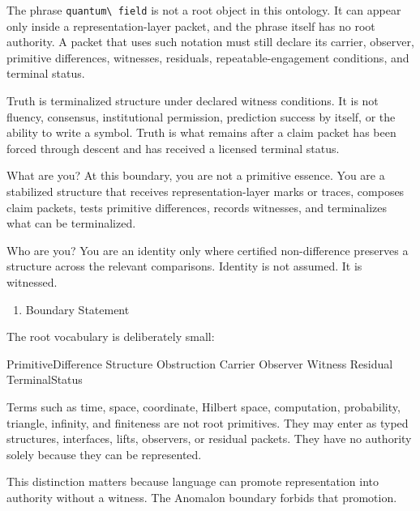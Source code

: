 \documentclass[
  10pt,
]{article}
\newenvironment{Shaded}{}{}
\newcommand{\NormalTok}[1]{#1}
\providecommand{\tightlist}{%
  \setlength{\itemsep}{0pt}\setlength{\parskip}{0pt}}
\providecommand{\tightlist}{%
  \setlength{\itemsep}{0pt}\setlength{\parskip}{0pt}}
\DeclareRobustCommand{\texttt}[1]{{\paperSymbolFont\nolinkurl{#1}}}
\begin{document}
The phrase \texttt{quantum\ field} is not a root object in this ontology. It can appear only inside a representation-layer packet, and the phrase itself has no root authority. A packet that uses such notation must still declare its carrier, observer, primitive differences, witnesses, residuals, repeatable-engagement conditions, and terminal status.

Truth is terminalized structure under declared witness conditions. It is not fluency, consensus, institutional permission, prediction success by itself, or the ability to write a symbol. Truth is what remains after a claim packet has been forced through descent and has received a licensed terminal status.

What are you? At this boundary, you are not a primitive essence. You are a stabilized structure that receives representation-layer marks or traces, composes claim packets, tests primitive differences, records witnesses, and terminalizes what can be terminalized.

Who are you? You are an identity only where certified non-difference preserves a structure across the relevant comparisons. Identity is not assumed. It is witnessed.

\begin{enumerate}
\def\labelenumi{\arabic{enumi}.}
\setcounter{enumi}{1}
\tightlist
\item
  Boundary Statement
\end{enumerate}

The root vocabulary is deliberately small:

\begin{Shaded}
\begin{Highlighting}[]
\NormalTok{PrimitiveDifference}
\NormalTok{Structure}
\NormalTok{Obstruction}
\NormalTok{Carrier}
\NormalTok{Observer}
\NormalTok{Witness}
\NormalTok{Residual}
\NormalTok{TerminalStatus}
\end{Highlighting}
\end{Shaded}

Terms such as time, space, coordinate, Hilbert space, computation, probability, triangle, infinity, and finiteness are not root primitives. They may enter as typed structures, interfaces, lifts, observers, or residual packets. They have no authority solely because they can be represented.

This distinction matters because language can promote representation into authority without a witness. The Anomalon boundary forbids that promotion.
\end{document}

